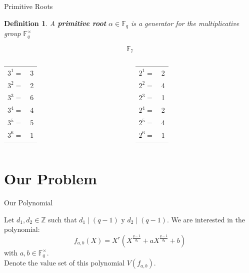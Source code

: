 \documentclass{beamer}
\newtheorem*{definition*}{Definition}
\begin{document}
\begin{frame}{Primitive Roots}

\begin{definition*}
  A \textbf{primitive root} $\alpha \in \mathbb{F}_q$ is a generator for the multiplicative group $\mathbb{F}_{q}^{\times}$
\end{definition*}

\pause
  
{\Large $$\mathbb{F}_{7}$$}
\pause
\begin{columns}[t] %
{\Large \begin{tabular}{ l  r }
  $3^1=$ & 3 \\
  $3^2=$ & 2 \\
  $3^3=$ & 6 \\
  $3^4=$ & 4 \\
  $3^5=$ & 5 \\
  $3^6=$ & 1 \\
\end{tabular}}
\pause
{}
{\Large \begin{tabular}{ l  r }
  $2^1=$ & 2 \\
  $2^2=$ & 4 \\
  $2^3=$ & 1 \\
  $2^4=$ & 2 \\
  $2^5=$ & 4 \\
  $2^6=$ & 1 \\
\end{tabular}}
\end{columns}

\end{frame}


\section{Our Problem} %
\label{sec:our_problem}



\begin{frame}{Our Polynomial}
  

  Let $d_1, d_2 \in \mathbb{Z}$ such that $d_1 \mid (q-1)$ y $d_2 \mid (q-1)$. We are interested in the polynomial:
  {\Large$$f_{a,b}(X) = X^r(X^{\frac{q-1}{d_1}} + aX^{\frac{q-1}{d_2}} +b)$$ }
  with $a,b \in \mathbb{F}_q^{\times}$. 
  \pause 
  $$$$
  Denote the value set of this polynomial $V(f_{a,b})$.

\end{frame}
\end{document}
